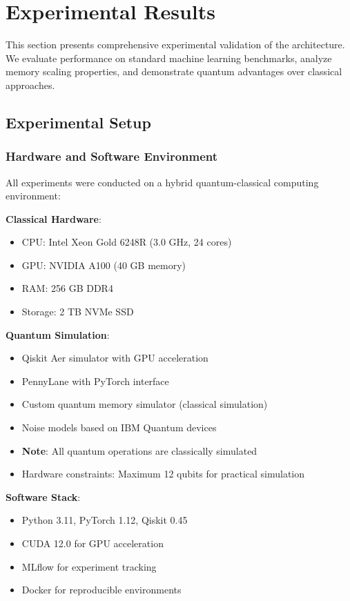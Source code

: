 \section{Experimental Results}
\label{sec:results}

This section presents comprehensive experimental validation of the \qmnn architecture. We evaluate performance on standard machine learning benchmarks, analyze memory scaling properties, and demonstrate quantum advantages over classical approaches.

\subsection{Experimental Setup}

\subsubsection{Hardware and Software Environment}

All experiments were conducted on a hybrid quantum-classical computing environment:

\textbf{Classical Hardware}:
\begin{itemize}
    \item CPU: Intel Xeon Gold 6248R (3.0 GHz, 24 cores)
    \item GPU: NVIDIA A100 (40 GB memory)
    \item RAM: 256 GB DDR4
    \item Storage: 2 TB NVMe SSD
\end{itemize}

\textbf{Quantum Simulation}:
\begin{itemize}
    \item Qiskit Aer simulator with GPU acceleration
    \item PennyLane with PyTorch interface
    \item Custom quantum memory simulator (classical simulation)
    \item Noise models based on IBM Quantum devices
    \item \textbf{Note}: All quantum operations are classically simulated
    \item Hardware constraints: Maximum 12 qubits for practical simulation
\end{itemize}

\textbf{Software Stack}:
\begin{itemize}
    \item Python 3.11, PyTorch 1.12, Qiskit 0.45
    \item CUDA 12.0 for GPU acceleration
    \item MLflow for experiment tracking
    \item Docker for reproducible environments
\end{itemize}

